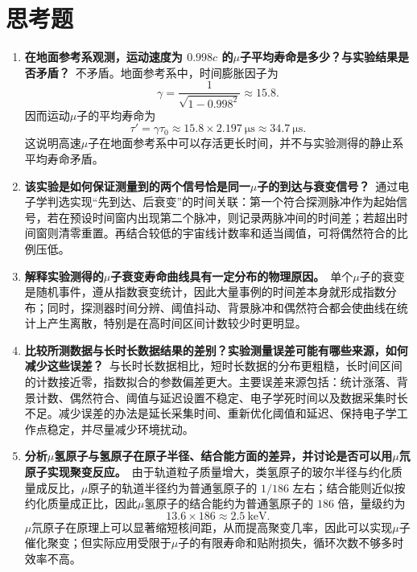 \documentclass[12pt,a4paper]{article}
\begin{document}
\section{思考题}
\begin{enumerate}
    \item \textbf{在地面参考系观测，运动速度为 $0.998c$ 的$\mu$子平均寿命是多少？与实验结果是否矛盾？}\
    不矛盾。地面参考系中，时间膨胀因子为
    \begin{equation}
        \gamma = \frac{1}{\sqrt{1-0.998^2}} \approx 15.8.
    \end{equation}
    因而运动$\mu$子的平均寿命为
    \begin{equation}
        \tau' = \gamma\tau_0 \approx 15.8\times\SI{2.197}{\micro\second} \approx \SI{34.7}{\micro\second}.
    \end{equation}
    这说明高速$\mu$子在地面参考系中可以存活更长时间，并不与实验测得的静止系平均寿命矛盾。

    \item \textbf{该实验是如何保证测量到的两个信号恰是同一$\mu$子的到达与衰变信号？}\
    通过电子学判选实现“先到达、后衰变”的时间关联：第一个符合探测脉冲作为起始信号，若在预设时间窗内出现第二个脉冲，则记录两脉冲间的时间差；若超出时间窗则清零重置。再结合较低的宇宙线计数率和适当阈值，可将偶然符合的比例压低。

    \item \textbf{解释实验测得的$\mu$子衰变寿命曲线具有一定分布的物理原因。}\
    单个$\mu$子的衰变是随机事件，遵从指数衰变统计，因此大量事例的时间差本身就形成指数分布；同时，探测器时间分辨、阈值抖动、背景脉冲和偶然符合都会使曲线在统计上产生离散，特别是在高时间区间计数较少时更明显。

    \item \textbf{比较所测数据与长时长数据结果的差别？实验测量误差可能有哪些来源，如何减少这些误差？}\
    与长时长数据相比，短时长数据的分布更粗糙，长时间区间的计数接近零，指数拟合的参数偏差更大。主要误差来源包括：统计涨落、背景计数、偶然符合、阈值与延迟设置不稳定、电子学死时间以及数据采集时长不足。减少误差的办法是延长采集时间、重新优化阈值和延迟、保持电子学工作点稳定，并尽量减少环境扰动。

    \item \textbf{分析$\mu$氢原子与氢原子在原子半径、结合能方面的差异，并讨论是否可以用$\mu$氘原子实现聚变反应。}\
    由于轨道粒子质量增大，类氢原子的玻尔半径与约化质量成反比，$\mu$原子的轨道半径约为普通氢原子的 $1/186$ 左右；结合能则近似按约化质量成正比，因此$\mu$氢原子的结合能约为普通氢原子的 $186$ 倍，量级约为
    \begin{equation}
        13.6\times 186 \approx \SI{2.5}{\kilo\electronvolt}.
    \end{equation}
    $\mu$氘原子在原理上可以显著缩短核间距，从而提高聚变几率，因此可以实现$\mu$子催化聚变；但实际应用受限于$\mu$子的有限寿命和贴附损失，循环次数不够多时效率不高。
\end{enumerate}
\end{document}
